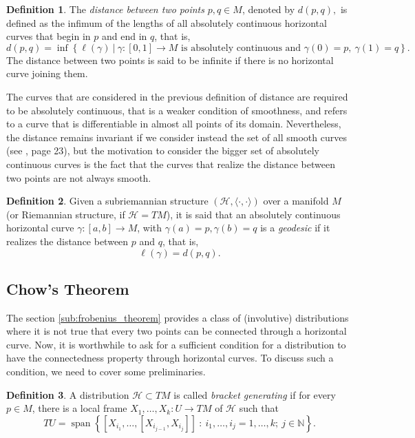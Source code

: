 \documentclass[12pt, letterpaper, reqno]{amsart}
\theoremstyle{definition}
\newtheorem{df}{Definition}
\theoremstyle{plain}
\theoremstyle{remark}
\begin{document}
\begin{df}
	The \textit{distance between two points} $ p,q\in M $, denoted by $ d(p,q), $   is defined as the infimum of the lengths of all absolutely continuous horizontal curves that begin in $ p $ and end in $ q $, that is, 
$$ d(p,q) = \operatorname{inf} \left\{ \ell(\gamma) \ |\ \gamma:[0,1] \rightarrow {M} \text{ is absolutely continuous and }\gamma(0)=p, \ \gamma(1)=q \right\}. $$ 
The distance between two points is said to be infinite if there is no horizontal curve joining them.
\end{df}

The curves that are considered in the previous definition of distance are required to be absolutely continuous, that is a weaker condition of smoothness, and refers to a curve that is differentiable in almost all points of its domain. Nevertheless, the distance remains invariant if we consider instead the set of all smooth curves (see \cite{montgomery2002tour}, page 23), but the motivation to consider the bigger set of absolutely continuous curves is the fact that the curves that realize the distance between two points are not always smooth.

\begin{df}
	Given a subriemannian structure $ (\mathcal{H}, \langle\cdot,\cdot\rangle) $ over a manifold $ M $  (or Riemannian structure, if $ \mathcal{H}=TM $), it is said that an absolutely continuous horizontal curve $ \gamma:  [a,b] \rightarrow M$, with $ \gamma(a)=p, \gamma(b)=q $ is a \textit{geodesic} if it realizes the distance between $ p $ and $ q $, that is,   
	$$ \ell(\gamma)= d(p,q). $$ 
\end{df}


\subsection{Chow's Theorem}%
\label{sub:chow_s_theorem}

The section \ref{sub:frobenius_theorem} provides a class of (involutive) distributions where it is not true that every two points can be connected through a horizontal curve.  Now, it is worthwhile to ask for a sufficient condition for a distribution to have the connectedness property through horizontal curves. To discuss such a condition, we need to cover some preliminaries. 

\begin{df}
	A distribution $ \mathcal{H}\subset TM $ is called \textit{bracket generating} if for every $ p\in M $, there is a local frame $ X_1,\dots,X_k: U \rightarrow {TM} $ of $ \mathcal{H} $ such that 
	$$ TU = \operatorname{span}\left\{ [X_{i_1},\dots,[X_{i_{j-1}},X_{i_j}]]\ : \ i_1,\dots,i_j=1,\dots,k;\ j\in \mathbb{N} \right\}.  $$ 
\end{df}
\end{document}
